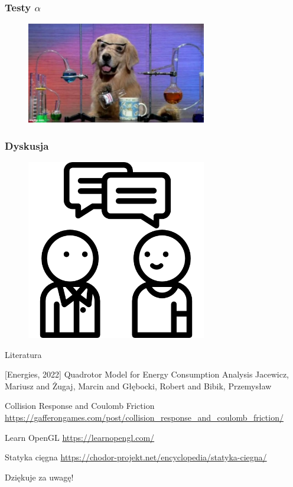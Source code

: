 \documentclass[aspectratio=169]{beamer}
\begin{document}
\begin{frame}
	\frametitle{Testy $\alpha$} %
	\begin{figure}
		\centering
		\includegraphics[width=0.7\textwidth]{dog.jpg}
	\end{figure}
\end{frame}


\begin{frame}
	\frametitle{Dyskusja}
	\begin{figure}
		\centering
		\includegraphics[width=0.7\textwidth]{questions.png}
	\end{figure}
\end{frame}

\begin{frame}{Literatura}
\begin{thebibliography}{10}
\beamertemplatebookbibitems
{}[Energies, 2022] Quadrotor Model for Energy Consumption Analysis
   \newblock  Jacewicz, Mariusz and Żugaj, Marcin and Głębocki, Robert and Bibik, Przemysław
   
  Collision Response and Coulomb Friction
 \newblock \url{https://gafferongames.com/post/collision_response_and_coulomb_friction/}
 
   Learn OpenGL
 \newblock \url{ https://learnopengl.com/}
 
   Statyka cięgna
 \newblock \url{ https://chodor-projekt.net/encyclopedia/statyka-ciegna/}

\end{thebibliography}
\end{frame}

\begin{frame}
	  \begin{center}
	\Huge Dziękuje za uwagę!
	\end{center}
\end{frame}
\end{document}
